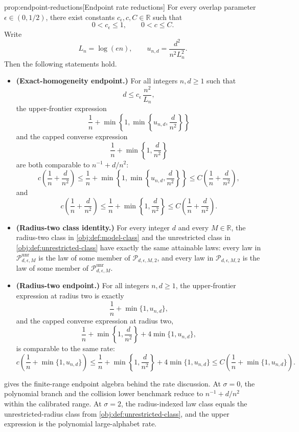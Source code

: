 \begin{propositionv}{prop:endpoint-reductions}[Endpoint rate reductions]
For every overlap parameter \(\epsilon\in(0,1/2)\), there exist constants \(c_\epsilon,c,C\in\mathbb R\) such that
\[
0<c_\epsilon\le 1,
\qquad
0<c\le C .
\]
Write
\[
L_n=\log(en),
\qquad
u_{n,d}=\frac{d^2}{n^2L_n^2}.
\]
Then the following statements hold.
\begin{itemize}
\item \textbf{(Exact-homogeneity endpoint.)} For all integers \(n,d\ge1\) such that
\[
d\le c_\epsilon\,\frac{n^2}{L_n},
\]
the upper-frontier expression
\[
\frac1n+\min\left\{1,\min\left\{u_{n,d},\frac d{n^2}\right\}\right\}
\]
and the capped converse expression
\[
\frac1n+\min\left\{1,\frac d{n^2}\right\}
\]
are both comparable to \(n^{-1}+d/n^2\):
\[
c\left(\frac1n+\frac d{n^2}\right)
\le
\frac1n+\min\left\{1,\min\left\{u_{n,d},\frac d{n^2}\right\}\right\}
\le
C\left(\frac1n+\frac d{n^2}\right),
\]
and
\[
c\left(\frac1n+\frac d{n^2}\right)
\le
\frac1n+\min\left\{1,\frac d{n^2}\right\}
\le
C\left(\frac1n+\frac d{n^2}\right).
\]
\item \textbf{(Radius-two class identity.)} For every integer \(d\) and every \(M\in\mathbb R\), the radius-two class in \cref{obj:def:model-class} and the unrestricted class in \cref{obj:def:unrestricted-class} have exactly the same attainable laws: every law in \(\mathcal P_{d,\epsilon,M}^{\mathrm{unr}}\) is the law of some member of \(\mathcal P_{d,\epsilon,M,2}\), and every law in \(\mathcal P_{d,\epsilon,M,2}\) is the law of some member of \(\mathcal P_{d,\epsilon,M}^{\mathrm{unr}}\).
\item \textbf{(Radius-two endpoint.)} For all integers \(n,d\ge1\), the upper-frontier expression at radius two is exactly
\[
\frac1n+\min\{1,u_{n,d}\},
\]
and the capped converse expression at radius two,
\[
\frac1n+\min\left\{1,\frac d{n^2}\right\}+4\min\{1,u_{n,d}\},
\]
is comparable to the same rate:
\[
c\left(\frac1n+\min\{1,u_{n,d}\}\right)
\le
\frac1n+\min\left\{1,\frac d{n^2}\right\}+4\min\{1,u_{n,d}\}
\le
C\left(\frac1n+\min\{1,u_{n,d}\}\right).
\]
\end{itemize}
\end{propositionv}

 gives the finite-range endpoint algebra behind the rate discussion. At \(\sigma=0\), the polynomial branch and the collision lower benchmark reduce to \(n^{-1}+d/n^2\) within the calibrated range. At \(\sigma=2\), the radius-indexed law class equals the unrestricted-radius class from \cref{obj:def:unrestricted-class}, and the upper expression is the polynomial large-alphabet rate.

